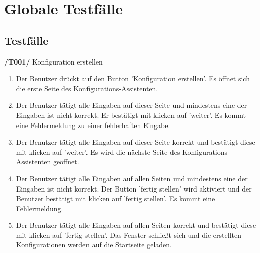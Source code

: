 \section{Globale Testfälle}

\subsection{Testfälle}



\textbf{/T001/} Konfiguration erstellen
\begin{enumerate}
\item {}
{Der Benutzer drückt auf den Button 'Konfiguration erstellen'.}
{Es öffnet sich die erste Seite des Konfigurations-Assistenten.}

\item {}
{Der Benutzer tätigt alle Eingaben auf dieser Seite und mindestens eine der Eingaben ist nicht korrekt. Er bestätigt mit klicken auf 'weiter'.}
{Es kommt eine Fehlermeldung zu einer fehlerhaften Eingabe.}

\item {}
{Der Benutzer tätigt alle Eingaben auf dieser Seite korrekt und bestätigt diese mit klicken auf 'weiter'.}
{Es wird die nächste Seite des Konfigurations-Assistenten geöffnet.}

\item {}
{Der Benutzer tätigt alle Eingaben auf allen Seiten und mindestens eine der Eingaben ist nicht korrekt. Der Button 'fertig stellen' wird aktiviert und der Benutzer bestätigt mit klicken auf 'fertig stellen'.}
{Es kommt eine Fehlermeldung.}

\item {}
{Der Benutzer tätigt alle Eingaben auf allen Seiten korrekt und bestätigt diese mit klicken auf 'fertig stellen'.}
{Das Fenster schließt sich und die erstellten Konfigurationen werden auf die Startseite geladen.}


\end{enumerate}

